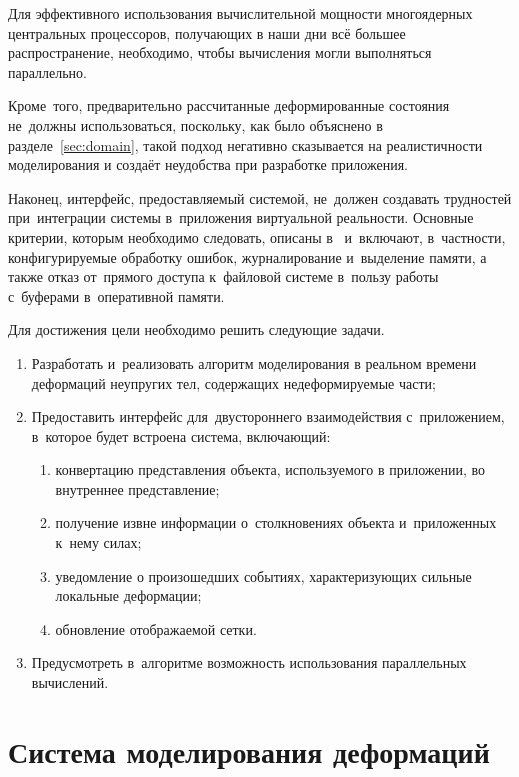 \documentclass[a4paper, 14pt, titlepage]{extarticle}
\let\oldsection\section
\renewcommand{\section}{\newpage\oldsection}
\begin{document}
    Для эффективного использования вычислительной мощности многоядерных центральных процессоров,
    получающих в наши дни всё большее распространение, необходимо, чтобы вычисления могли
    выполняться параллельно.

    Кроме~того, предварительно рассчитанные деформированные состояния не~должны использоваться,
    поскольку, как было объяснено в разделе~\ref{sec:domain}, такой подход негативно сказывается на реалистичности
    моделирования и создаёт неудобства при разработке приложения.

    Наконец, интерфейс, предоставляемый системой, не~должен создавать трудностей при~интеграции
    системы в~приложения виртуальной реальности. Основные критерии, которым необходимо следовать,
    описаны в~\cite{gems-middleware} и~включают, в~частности, конфигурируемые обработку ошибок,
    журналирование и~выделение памяти, а также отказ от~прямого доступа к~файловой системе в~пользу
    работы с~буферами в~оперативной памяти.

    Для достижения цели необходимо решить следующие задачи.
    \begin{enumerate}
      \item Разработать и~реализовать алгоритм моделирования в реальном времени деформаций
        не\-у\-пру\-гих тел, содержащих недеформируемые части;
      \item Предоставить интерфейс для~двустороннего взаимодействия с~приложением, в~которое будет
        встроена система, включающий:
        \begin{enumerate}
          \item конвертацию представления объекта, используемого в приложении, во внутреннее представление;
          \item получение извне информации о~столкновениях объекта и~приложенных к~нему силах;
          \item уведомление о произошедших событиях, характеризующих сильные локальные деформации;
          \item обновление отображаемой сетки.
        \end{enumerate}
      \item Предусмотреть в~алгоритме возможность использования параллельных вычислений.
    \end{enumerate}

  \section{Система моделирования деформаций}
\end{document}
